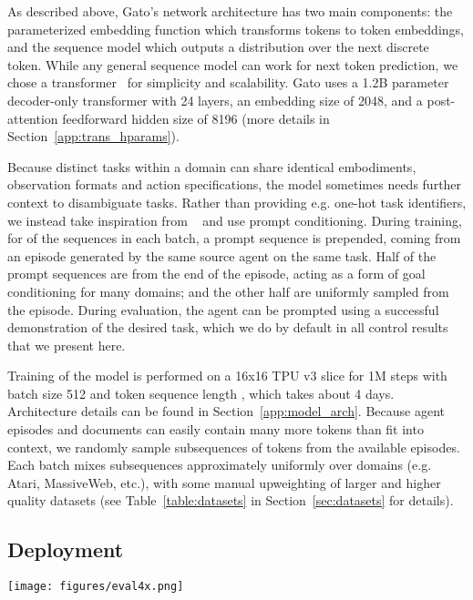 \documentclass[10pt]{article} \usepackage[accepted]{tmlr}
\newcommand{\model}{{Gato}}
\begin{document}
As described above, \model{}'s network architecture has two main components: the parameterized embedding function which transforms tokens to token embeddings, and the sequence model which outputs a distribution over the next discrete token.
While any general sequence model can work for next token prediction, we chose a transformer~\citep{vaswani2017attention} for simplicity and scalability.
\model{} uses a 1.2B parameter decoder-only transformer with 24 layers, an embedding size of 2048, and a post-attention feedforward hidden size of 8196 (more details in Section~\ref{app:trans_hparams}).

Because distinct tasks within a domain can share identical embodiments, observation formats and action specifications, the model sometimes needs further context to disambiguate tasks.
Rather than providing e.g. one-hot task identifiers, we instead take inspiration from ~\citep{sanh2022multitask,wei2021finetuned,brown2020language} and use prompt conditioning.
During training, for  of the sequences in each batch, a prompt sequence is prepended, coming from an episode generated by the same source agent on the same task.
Half of the prompt sequences are from the end of the episode, acting as a form of goal conditioning for many domains; and the other half are uniformly sampled from the episode.
During evaluation, the agent can be prompted using a successful demonstration of the desired task, which we do by default in all control results that we present here.

Training of the model is performed on a 16x16 TPU v3 slice for 1M steps with batch size 512 and token sequence length , which takes about 4 days.
Architecture details can be found in Section~\ref{app:model_arch}.
Because agent episodes and documents can easily contain many more tokens than fit into context, we randomly sample subsequences of  tokens from the available episodes.
Each batch mixes subsequences approximately uniformly over domains (e.g. Atari, MassiveWeb, etc.), with some manual upweighting of larger and higher quality datasets (see Table~\ref{table:datasets} in Section~\ref{sec:datasets} for details).
\vskip 0.4cm
\subsection{Deployment}
\label{sec:evaluation_protocol}
\vskip 0.2cm
\begin{figure*}[t]
	\centering
	\texttt{[image: figures/eval4x.png]}
	\caption{\textbf{Running \model{} as a control policy.} \model{} consumes a sequence of interleaved tokenized observations, separator tokens, and previously sampled actions to produce the next action in standard autoregressive manner. The new action is applied to the environment -- a game console in this illustration, a new set of observations is obtained, and the process repeats.}
	\label{fig:evaluation}
\end{figure*}
\end{document}
